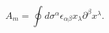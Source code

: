 \begin{equation}
\label{contourmink}
A_m=\oint d\sigma^{\alpha}\epsilon_{\alpha \beta}x_{\lambda}\partial^{\beta}x^{\lambda}.
\end{equation}

